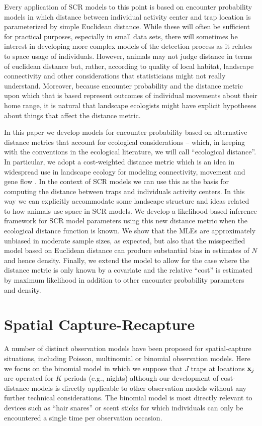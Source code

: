 \documentclass[12pt]{article}
\begin{document}
Every application of SCR models to this point is based on encounter 
probability models in which distance between individual activity center 
and trap location is parameterized by simple Euclidean distance.
While these will often be sufficient for practical purposes,
especially in small data sets, there will sometimes be interest in
developing more complex models of the detection process as it relates
to space usage of individuals.
However, animals may not judge distance in terms of euclidean distance
but, rather, according to quality of local habitat, landscape
connectivity and other considerations that statisticians might not
really understand. Moreover, because encounter probability and the
distance metric upon which that is based represent outcomes of
individual movements about their home range, it is natural that
landscape ecologists might have explicit hypotheses about things that
affect the distance metric.

In this paper we develop models for encounter probability based on
alternative distance metrics that account for ecological
considerations -- which, in keeping with the conventions in the
ecological literature, we will call ``ecological distance''. In
particular, we adopt a cost-weighted distance metric which is an idea
in widespread use in landscape ecology for modeling connectivity,
movement and gene flow
\citep{adriaensen_etal:2003,manel_etal:2003,mcrae_etal:2008}. In the
context of SCR models we can use this as the basis for computing the
distance between traps and individuals activity centers. In this way
we can explicitly accommodate some landscape structure and ideas
related to how animals use space in SCR models. We develop a
likelihood-based inference framework for SCR model parameters using
this new distance metric when the ecological distance function is
known.  We show that the MLEs are approximately unbiased in moderate
sample sizes, as expected, but also that the misspecified model based
on Euclidean distance can produce substantial bias in estimates of $N$
and hence density.  Finally, we extend the model to allow for the case
where the distance metric is only known by a covariate and the
relative ``cost'' is estimated by maximum likelihood in addition to
other encounter probability parameters and density.


\section{Spatial Capture-Recapture}

A number of distinct observation models have been proposed for
spatial-capture situations, including Poisson, multinomial or binomial
observation models. Here we focus on the binomial model in which we
suppose that $J$ traps at locations ${\bf x}_{j}$ are operated for $K$
periods (e.g., nights) although our development of cost-distance
models is directly applicable to other observation models without any
further technical considerations. The binomial model is most directly
relevant to devices such as ``hair snares'' \citep{gardner_etal:2010} or
scent sticks \citep{kery_etal:2010} for which individuals can only be
encountered a single time per observation occasion.
\end{document}
